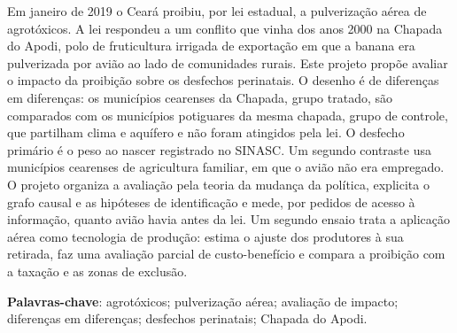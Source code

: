 \setlength{\absparsep}{18pt}
\begin{resumo}
Em janeiro de 2019 o Ceará proibiu, por lei estadual, a pulverização aérea de
agrotóxicos. A lei respondeu a um conflito que vinha dos anos 2000 na Chapada
do Apodi, polo de fruticultura irrigada de exportação em que a banana era
pulverizada por avião ao lado de comunidades rurais. Este projeto propõe
avaliar o impacto da proibição sobre os desfechos perinatais. O desenho é de
diferenças em diferenças: os municípios cearenses da Chapada, grupo tratado,
são comparados com os municípios potiguares da mesma chapada, grupo de
controle, que partilham clima e aquífero e não foram atingidos pela lei. O
desfecho primário é o peso ao nascer registrado no SINASC. Um segundo
contraste usa municípios cearenses de agricultura familiar, em que o avião não
era empregado. O projeto organiza a avaliação pela teoria da mudança da política,
explicita o grafo causal e as hipóteses de identificação e mede, por pedidos
de acesso à informação, quanto avião havia antes da lei. Um segundo ensaio
trata a aplicação aérea como tecnologia de produção: estima o ajuste dos
produtores à sua retirada, faz uma avaliação parcial de custo-benefício e
compara a proibição com a taxação e as zonas de exclusão.

\vspace{\onelineskip}
\noindent\textbf{Palavras-chave}: agrotóxicos; pulverização aérea; avaliação de
impacto; diferenças em diferenças; desfechos perinatais; Chapada do Apodi.
\end{resumo}
